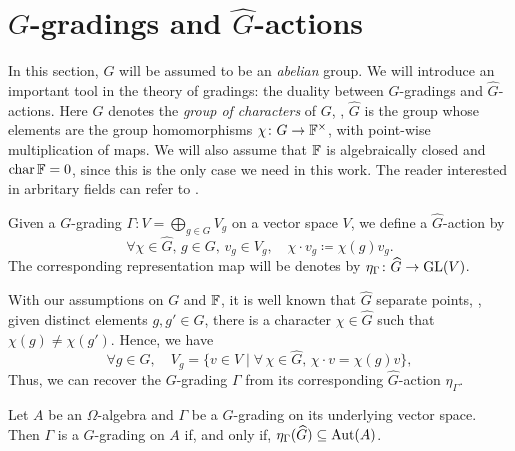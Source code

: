 \section{\texorpdfstring{$G$}{G}-gradings and \texorpdfstring{$\widehat{G}$}{G-hat}-actions}\label{sec:g-hat-action}

In this section, $G$ will be assumed to be an \emph{abelian} group. 
We will introduce an important tool in the theory of gradings: the duality between $G$-gradings and $\widehat G$-actions. 
Here $\widehat G$ denotes the \emph{group of characters} of $G$, \ie, $\widehat G$ is the group whose elements are the group homomorphisms $\chi\colon G \to \mathbb{F}^\times$, with point-wise multiplication of maps. 
We will also assume that $\mathbb{F}$ is algebraically closed and $\operatorname{char} \mathbb{F} = 0$, since this is the only case we need in this work. 
The reader interested in arbritary fields can refer to \cite{livromicha}. 


\begin{defi}
    Given a $G$-grading $\Gamma : V = \bigoplus_{g\in G} V_g$ on a vector space $V$, we define a $\widehat G$-action by
    \[
        \forall \chi \in \widehat G, \, g\in G, \, v_g \in V_g, \quad \chi \cdot v_g \coloneqq \chi(g) v_g. 
    \]
    The corresponding representation map will be denotes by $\eta_\Gamma \colon \widehat G \to \operatorname{GL} (V)$. 
\end{defi}

With our assumptions on $G$ and $\mathbb{F}$, it is well known that $\widehat G$ separate points, \ie, given distinct elements $g, g'\in G$, there is a character $\chi \in \widehat G$ such that $\chi(g) \neq \chi(g')$. 
Hence, we have 
\[
    \forall g\in G, \quad V_g = \{ v\in V \mid \forall\, \chi \in \widehat G, \, \chi \cdot v = \chi(g)v \},
\]
Thus, we can recover the $G$-grading $\Gamma$ from its corresponding $\widehat G$-action $\eta_\Gamma$. 


\begin{prop}\label{prop:g-hat-Aut-A}
	Let $A$ be an $\Omega$-algebra and $\Gamma$ be a $G$-grading on its underlying vector space.
	Then $\Gamma$ is a $G$-grading on $A$ 
	if, and only if, $\eta_\Gamma(\widehat G) \subseteq \operatorname{Aut}(A)$.
\end{prop}

